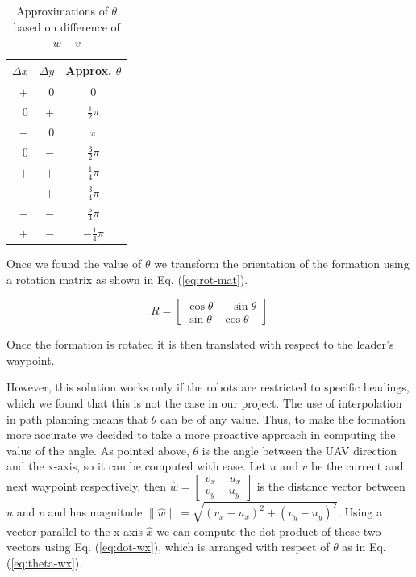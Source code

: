 \begin{table}
	\caption{Approximations of $\theta$ based on difference of $w - v$}\label{tab:approx}
	\begin{center}
		\begin{tabular}[c]{r|r|c}
			\hline
			\multicolumn{1}{c|}{\textbf{$\Delta x$}} & 
			\multicolumn{1}{c|}{\textbf{$\Delta y$}} &
			\multicolumn{1}{c}{Approx. \textbf{$\theta$}} \\
			\hline
			\hline
			$+$ & $0$ & $0$ \\
			\hline
			$0$ & $+$ & $\frac{1}{2}\pi$ \\
			\hline
			$-$ & $0$ & $\pi$ \\
			\hline
			$0$ & $-$ & $\frac{3}{2}\pi$ \\
			\hline
			$+$ & $+$ & $\frac{1}{4}\pi$ \\
			\hline
			$-$ & $+$ & $\frac{3}{4}\pi$ \\
			\hline
			$-$ & $-$ & $\frac{5}{4}\pi$ \\
			\hline
			$+$ & $-$ & $-\frac{1}{4}\pi$ \\
			\hline
		\end{tabular}
	\end{center}
\end{table}

Once we found the value of $\theta$ we transform the orientation of the formation using a rotation matrix
as shown in Eq. (\ref{eq:rot-mat}).

\begin{equation}
	R = \begin{bmatrix} \cos \theta & -\sin \theta \\ \sin \theta & \cos \theta \end{bmatrix}
	\label{eq:rot-mat}
\end{equation}

Once the formation is rotated it is then translated with respect to the leader's waypoint.

However, this solution works only if the robots are restricted to specific headings, which
we found that this is not the case in our project. The use of interpolation in path planning
means that $\theta$ can be of any value. Thus, to make the formation more accurate we decided
to take a more proactive approach in computing the value of the angle. As pointed above, $\theta$ 
is the angle between the UAV direction and the x-axis, so it can be computed with ease.
Let $u$ and $v$ be the current and next waypoint respectively, then 
$\hat{w} = \begin{bmatrix} v_x - u_x \\ v_y - u_y \end{bmatrix}$ is the distance vector between
$u$ and $v$ and has magnitude $\parallel \hat{w} \parallel = \sqrt{(v_x - u_x)^2 + (v_y - u_y)^2}$.
Using a vector parallel to the x-axis $\hat{x}$ we can compute the dot product of these two vectors
using Eq. (\ref{eq:dot-wx}), which is arranged with respect of $\theta$ as in Eq. (\ref{eq:theta-wx}).

